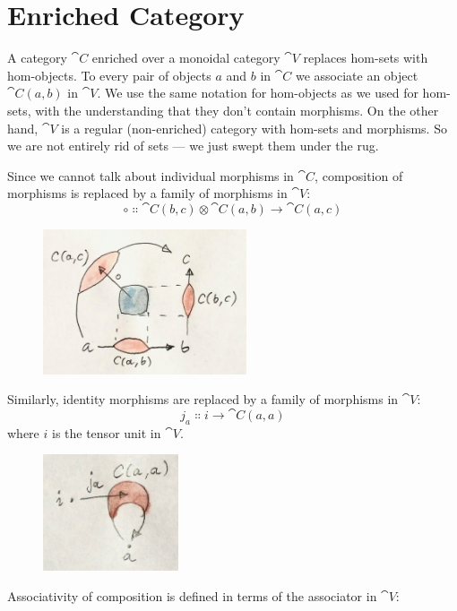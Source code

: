 \section{Enriched Category}

A category $\cat{C}$ enriched over a monoidal category $\cat{V}$ replaces
hom-sets with hom-objects. To every pair of objects $a$ and
$b$ in $\cat{C}$ we associate an object $\cat{C}(a, b)$ in
$\cat{V}$. We use the same notation for hom-objects as we used for
hom-sets, with the understanding that they don't contain morphisms. On
the other hand, $\cat{V}$ is a regular (non-enriched) category with
hom-sets and morphisms. So we are not entirely rid of sets --- we just
swept them under the rug.

Since we cannot talk about individual morphisms in $\cat{C}$, composition
of morphisms is replaced by a family of morphisms in $\cat{V}$:
\[\circ \Colon \cat{C}(b, c) \otimes \cat{C}(a, b) \to \cat{C}(a, c)\]

\begin{figure}[H]
\centering
\includegraphics[width=60mm]{images/composition.jpg}
\end{figure}

\noindent
Similarly, identity morphisms are replaced by a family of morphisms in
$\cat{V}$:
\[j_a \Colon i \to \cat{C}(a, a)\]
where $i$ is the tensor unit in $\cat{V}$.

\begin{figure}[H]
\centering
\includegraphics[width=40mm]{images/id.jpg}
\end{figure}

\noindent
Associativity of composition is defined in terms of the associator in
$\cat{V}$:

\begin{figure}[H]
\centering
{}
\end{figure}

